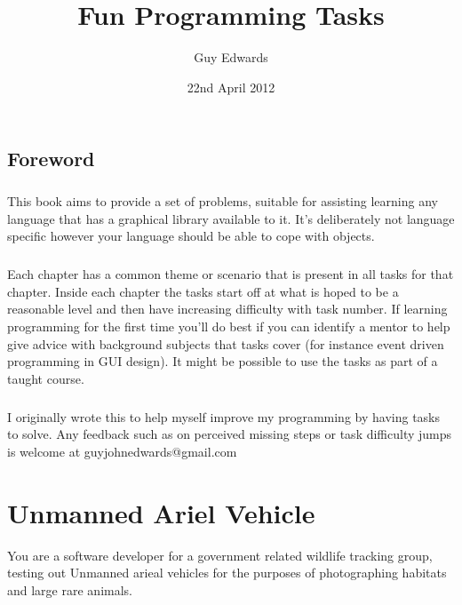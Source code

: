 \documentclass[11pt]{book}
\author{Guy Edwards}
\date{22nd April 2012}
\title{Fun Programming Tasks}
\begin{document}
\maketitle

\section{Foreword}

\paragraph{} This book aims to provide a set of problems, suitable for
assisting learning any language that has a graphical library available to it.
It's deliberately not language specific however your language should be able
to cope with objects.

\paragraph{} Each chapter has a common theme or scenario that is present in
all tasks for that chapter. Inside each chapter the tasks start off at what is
hoped to be a reasonable level and then have increasing difficulty with task
number. If learning programming for the first time you'll do best if you can
identify a mentor to help give advice with background subjects that tasks
cover (for instance event driven programming in GUI design). It might be
possible to use the tasks as part of a taught course.

\paragraph{} I originally wrote this to help myself improve my programming by
having tasks to solve. Any feedback such as on perceived missing steps or task
difficulty jumps is welcome at guyjohnedwards@gmail.com

\tableofcontents



\chapter{Unmanned Ariel Vehicle}

You are a software developer for a government related wildlife tracking group,
testing out Unmanned arieal vehicles for the purposes of photographing
habitats and large rare animals.

\clearpage
\end{document}
